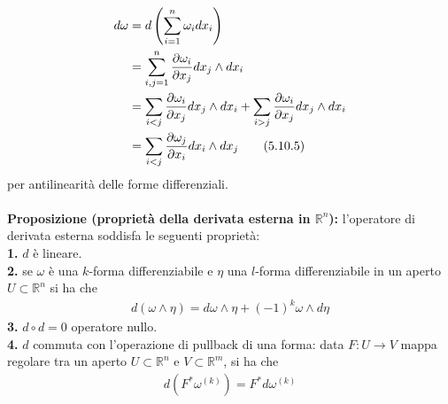 \documentclass{article}
\begin{document}
\begin{align}
    d\omega &= d\left(\sum_{i = 1}^n \omega_i dx_i\right) \notag \\
    &= \sum_{i, j = 1}^n \frac{\partial \omega_i}{\partial x_j}dx_j \wedge dx_i \notag \\
    &= \sum_{i < j}\frac{\partial \omega_i}{\partial x_j}dx_j \wedge dx_i + \sum_{i > j}\frac{\partial \omega_i}{\partial x_j}dx_j \wedge dx_i \notag \\
    &= \sum_{i < j}\frac{\partial \omega_j}{\partial x_i}dx_i \wedge dx_j \tag{5.10.5}
\end{align}
per antilinearità delle forme differenziali. \\ \\
\textbf{Proposizione (proprietà della derivata esterna in $\mathbb{R}^n$):} l'operatore di derivata esterna soddisfa le seguenti proprietà: \\
\textbf{1.} $d$ è lineare. \\
\textbf{2.} se $\omega$ è una $k$-forma differenziabile e $\eta$ una $l$-forma differenziabile in un aperto $U \subset \mathbb{R}^n$ si ha che
\begin{align}
    d(\omega \wedge \eta) = d\omega \wedge \eta + (-1)^k\omega \wedge d\eta \tag{5.10.6}
\end{align}
\textbf{3.} $d \circ d = 0$ operatore nullo. \\
\textbf{4.} $d$ commuta con l'operazione di pullback di una forma: data $F : U \longrightarrow V$ mappa regolare tra un aperto $U \subset \mathbb{R}^n$ e $V \subset \mathbb{R}^m$, si ha che
\begin{align}
    d(F^*\omega^{(k)}) = F^*d\omega^{(k)} \tag{5.10.7}
\end{align} \\
\end{document}
